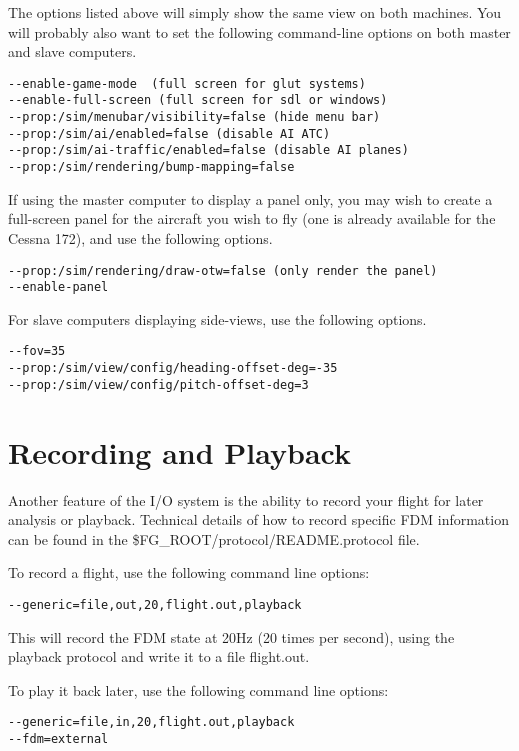 The options listed above will simply show the same view on both machines. You will probably also want to set the
following command-line options on both master and slave computers.

\begin{verbatim}
--enable-game-mode  (full screen for glut systems)
--enable-full-screen (full screen for sdl or windows)
--prop:/sim/menubar/visibility=false (hide menu bar)
--prop:/sim/ai/enabled=false (disable AI ATC)
--prop:/sim/ai-traffic/enabled=false (disable AI planes)
--prop:/sim/rendering/bump-mapping=false
\end{verbatim}

If using the master computer to display a panel only, you may wish to create a full-screen panel for the
aircraft you wish to fly (one is already available for the Cessna 172), and use the following options.

\begin{verbatim}
--prop:/sim/rendering/draw-otw=false (only render the panel)
--enable-panel
\end{verbatim}

For slave computers displaying side-views, use the following options.

\begin{verbatim}
--fov=35
--prop:/sim/view/config/heading-offset-deg=-35
--prop:/sim/view/config/pitch-offset-deg=3
\end{verbatim}

\section{Recording and Playback}

Another feature of the I/O system is the ability to record your flight for
later analysis or playback. Technical details of how to record specific FDM
information can be found in the \$FG\_ROOT/protocol/README.protocol file.

To record a flight, use the following command line options:

\begin{verbatim}
--generic=file,out,20,flight.out,playback
\end{verbatim}

This will record the FDM state at 20Hz (20 times per second), using the playback
protocol and write it to a file flight.out.

To play it back later, use the following command line options:

\begin{verbatim}
--generic=file,in,20,flight.out,playback
--fdm=external
\end{verbatim}

